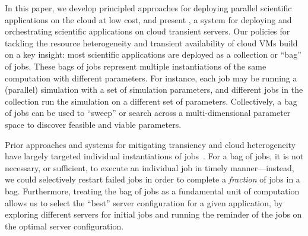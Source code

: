 
In this paper, we develop principled approaches for deploying parallel scientific applications on the cloud at low cost, and present \sysname, a system for deploying and orchestrating scientific applications on cloud transient servers. 
%
%
Our policies for tackling the resource heterogeneity and transient availability of cloud VMs build on a key insight: most scientific applications are deployed as a collection or ``bag'' of jobs. 
%
These bags of jobs represent multiple instantiations of the same computation with different parameters. 
%
For instance, each job may be running a (parallel) simulation with a set of simulation parameters, and different jobs in the collection run the simulation on a different set of parameters. 
Collectively, a bag of jobs can be used to ``sweep'' or search across a multi-dimensional parameter space to discover feasible and viable parameters.



Prior approaches and systems for mitigating transiency and cloud heterogeneity have largely targeted individual instantiations of jobs~\cite{spoton, exosphere, flint, marathe2014exploiting}. 
%
For a bag of jobs, it is not necessary, or sufficient, to execute an individual job in timely manner---instead, we could selectively restart failed jobs in order to complete a \emph{fraction} of jobs in a bag. 
%
Furthermore, treating the bag of jobs as a fundamental unit of computation allows us to select the ``best'' server configuration for a given application, by exploring different servers for initial jobs and running the reminder of the jobs on the optimal server configuration. 


